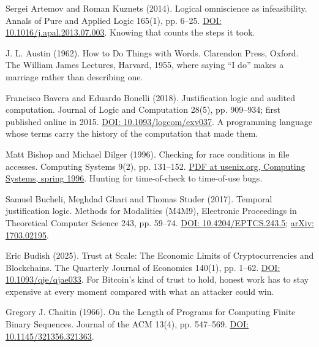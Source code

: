 \documentclass[11pt,twoside]{article}
\theoremstyle{thielethm}
\theoremstyle{thieledef}
\theoremstyle{thieledef}
\theoremstyle{thieledef}
\theoremstyle{thielethm}
\theoremstyle{thieleobs}
\theoremstyle{thielethm}
\begin{document}
\noindent Sergei Artemov and Roman Kuznets (2014). Logical omniscience as infeasibility. Annals of Pure and Applied Logic 165(1), pp. 6--25. \href{https://doi.org/10.1016/j.apal.2013.07.003}{DOI: 10.1016/j.apal.2013.07.003}. Knowing that counts the steps it took.
\par\medskip

\noindent J. L. Austin (1962). How to Do Things with Words. Clarendon Press, Oxford. The William James Lectures, Harvard, 1955, where saying ``I do'' makes a marriage rather than describing one.
\par\medskip

\noindent Francisco Bavera and Eduardo Bonelli (2018). Justification logic and audited computation. Journal of Logic and Computation 28(5), pp. 909--934; first published online in 2015. \href{https://doi.org/10.1093/logcom/exv037}{DOI: 10.1093/logcom/exv037}. A programming language whose terms carry the history of the computation that made them.
\par\medskip

\noindent Matt Bishop and Michael Dilger (1996). Checking for race conditions in file accesses. Computing Systems 9(2), pp. 131--152. \href{https://www.usenix.org/legacy/publications/compsystems/1996/spr_bishop.pdf}{PDF at usenix.org, Computing Systems, spring 1996}. Hunting for time-of-check to time-of-use bugs.
\par\medskip

\noindent Samuel Bucheli, Meghdad Ghari and Thomas Studer (2017). Temporal justification logic. Methods for Modalities (M4M9), Electronic Proceedings in Theoretical Computer Science 243, pp. 59--74. \href{https://doi.org/10.4204/EPTCS.243.5}{DOI: 10.4204/EPTCS.243.5}; \href{https://arxiv.org/abs/1703.02195}{arXiv: 1703.02195}.
\par\medskip

\noindent Eric Budish (2025). Trust at Scale: The Economic Limits of Cryptocurrencies and Blockchains. The Quarterly Journal of Economics 140(1), pp. 1--62. \href{https://doi.org/10.1093/qje/qjae033}{DOI: 10.1093/qje/qjae033}. For Bitcoin's kind of trust to hold, honest work has to stay expensive at every moment compared with what an attacker could win.
\par\medskip

\noindent Gregory J. Chaitin (1966). On the Length of Programs for Computing Finite Binary Sequences. Journal of the ACM 13(4), pp. 547--569. \href{https://doi.org/10.1145/321356.321363}{DOI: 10.1145/321356.321363}.
\par\medskip
\end{document}
